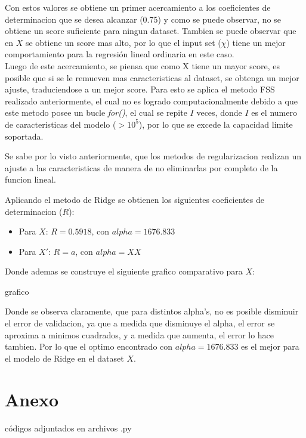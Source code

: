 \documentclass[10pt]{article}
\begin{document}
\begin{itemize}
Con estos valores se obtiene un primer acercamiento a los coeficientes de determinacion que se desea alcanzar (0.75) y como se puede observar, no se obtiene un score suficiente para ningun dataset. Tambien se puede observar que en $X$ se obtiene un score mas alto, por lo que el input set ($\chi$) tiene un mejor comportamiento para la regresión lineal ordinaria en este caso.\\

Luego de este acercamiento, se piensa que como X tiene un mayor score, es posible que si se le remueven mas caracteristicas al dataset, se obtenga un mejor ajuste, traduciendose a un mejor score. Para esto se aplica el metodo FSS realizado anteriormente, el cual no es logrado computacionalmente debido a que este metodo posee un bucle \textit{for()}, el cual se repite $I$ veces, donde $I$ es el numero de caracteristicas del modelo ($> 10^5$), por lo que se excede la capacidad limite soportada.

Se sabe por lo visto anteriormente, que los metodos de regularizacion realizan un ajuste a las caracteristicas de manera de no eliminarlas por completo de la funcion lineal.

Aplicando el metodo de Ridge se obtienen los siguientes coeficientes de determinacion ($R$):

\begin{itemize}

\item Para $X$: $R=0.5918$, con $alpha = 1676.833$
\item Para $X'$: $R=a$, con $alpha = XX$ 

\end{itemize}

Donde ademas se construye el siguiente grafico comparativo para $X$:

grafico

Donde se observa claramente, que para distintos alpha's, no es posible disminuir el error de validacion, ya que a medida que disminuye el alpha, el error se aproxima a minimos cuadrados, y a medida que aumenta, el error lo hace tambien. Por lo que el optimo encontrado con $alpha = 1676.833$ es el mejor para el modelo de Ridge en el dataset $X$. 


\end{itemize}
 
\section*{Anexo}

códigos adjuntados en archivos .py




\end{document}
